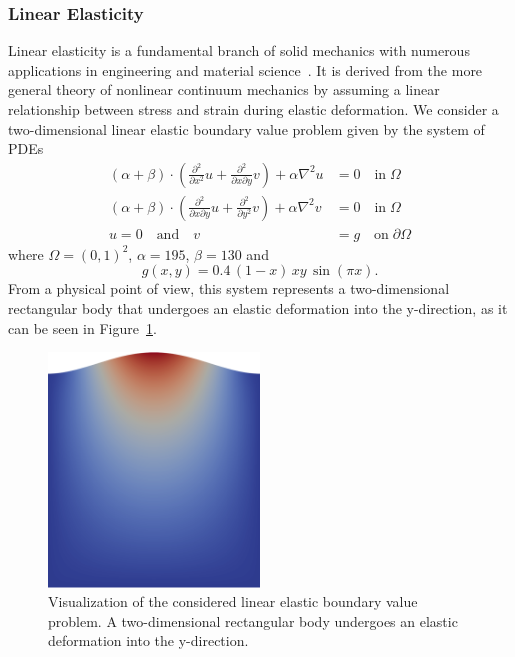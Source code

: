 \subsubsection{Linear Elasticity}
Linear elasticity is a fundamental branch of solid mechanics with numerous applications in engineering and material science~\cite{holzapfel2001nonlinear}.
It is derived from the more general theory of nonlinear continuum mechanics by assuming a linear relationship between stress and strain during elastic deformation.
We consider a two-dimensional linear elastic boundary value problem given by the system of PDEs
\begin{equation}
	\begin{split}
		(\alpha + \beta) \cdot (\frac{\partial^2}{\partial x^2} u + \frac{\partial^2}{\partial x \partial y} v) + \alpha \nabla^2 u & = 0 \quad \text{in} \; \Omega \\
		(\alpha + \beta) \cdot (\frac{\partial^2}{\partial x \partial y} u + \frac{\partial^2}{\partial y^2} v) + \alpha \nabla^2 v & = 0 \quad \text{in} \; \Omega \\
		u = 0 \quad \text{and} \quad v & = g \quad \text{on} \; \partial \Omega 
		\label{eq:linear-elasticity}
	\end{split}
\end{equation}
where $\Omega = (0,1)^2$, $\alpha = 195$, $\beta = 130$ and
\begin{equation*}
	g(x,y) = 0.4 \, (1 - x) \, x y \, \sin(\pi x).
\end{equation*}
From a physical point of view, this system represents a two-dimensional rectangular body that undergoes an elastic deformation into the y-direction, as it can be seen in Figure~\ref{fig:visualization-linear-elasticity}.
\begin{figure}
	\centering
	\includegraphics[width=0.5\textwidth]{figures/visualization-linear-elasticity1}
	\caption[Visualization of the considered linear elastic boundary value problem]{Visualization of the considered linear elastic boundary value problem. A two-dimensional rectangular body undergoes an elastic deformation into the y-direction.}
	\label{fig:visualization-linear-elasticity}
\end{figure}
